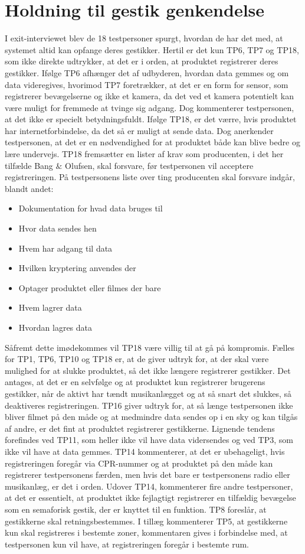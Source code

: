 \section{Holdning til gestik genkendelse}
\label{TestresultaterOvervaagning}
%
I exit-interviewet blev de 18 testpersoner spurgt, hvordan de har det med, at systemet altid kan opfange deres gestikker. Hertil er det kun TP6, TP7 og TP18, som ikke direkte udtrykker, at det er i orden, at produktet registrerer deres gestikker. Ifølge TP6 afhænger det af udbyderen, hvordan data gemmes og om data videregives, hvorimod TP7 foretrækker, at det er en form for sensor, som registrerer bevægelserne og ikke et kamera, da det ved et kamera potentielt kan være muligt for fremmede at tvinge sig adgang. Dog kommenterer testpersonen, at det ikke er specielt betydningsfuldt. Ifølge TP18, er det værre, hvis produktet har internetforbindelse, da det så er muligt at sende data. Dog anerkender testpersonen, at det er en nødvendighed for at produktet både kan blive bedre og lære undervejs. TP18 fremsætter en lister af krav som producenten, i det her tilfælde Bang $\&$ Olufsen, skal forsvare, før testpersonen vil acceptere registreringen. På testpersonens liste over ting producenten skal forsvare indgår, blandt andet:\blankline 
%
\begin{itemize}
  \item Dokumentation for hvad data bruges til
  \item Hvor data sendes hen
  \item Hvem har adgang til data
  \item Hvilken kryptering anvendes der
  \item Optager produktet eller filmes der bare
  \item Hvem lagrer data
  \item Hvordan lagres data\blankline
\end{itemize}
%
Såfremt dette imødekommes vil TP18 være villig til at gå på kompromis. Fælles for TP1, TP6, TP10 og TP18 er, at de giver udtryk for, at der skal være mulighed for at slukke produktet, så det ikke længere registrerer gestikker. Det antages, at det er en selvfølge og at produktet kun registrerer brugerens gestikker, når de aktivt har tændt musikanlægget og at så snart det slukkes, så deaktiveres registreringen. TP16 giver udtryk for, at så længe testpersonen ikke bliver filmet på den måde og at medmindre data sendes op i en sky og kan tilgås af andre, er det fint at produktet registrerer gestikkerne. Lignende tendens forefindes ved TP11, som heller ikke vil have data vidersendes og ved TP3, som ikke vil have at data gemmes. TP14 kommenterer, at det er ubehageligt, hvis registreringen foregår via CPR-nummer og at produktet på den måde kan registrerer testpersonens færden, men hvis det bare er testpersonens radio eller musikanlæg, er det i orden. Udover TP14, kommenterer fire andre testpersoner, at det er essentielt, at produktet ikke fejlagtigt registrerer en tilfældig bevægelse som en semaforisk gestik, der er knyttet til en funktion. TP8 foreslår, at gestikkerne skal retningsbestemmes. I tillæg kommenterer TP5, at gestikkerne kun skal registreres i bestemte zoner, kommentaren gives i forbindelse med, at testpersonen kun vil have, at registreringen foregår i bestemte rum.  


